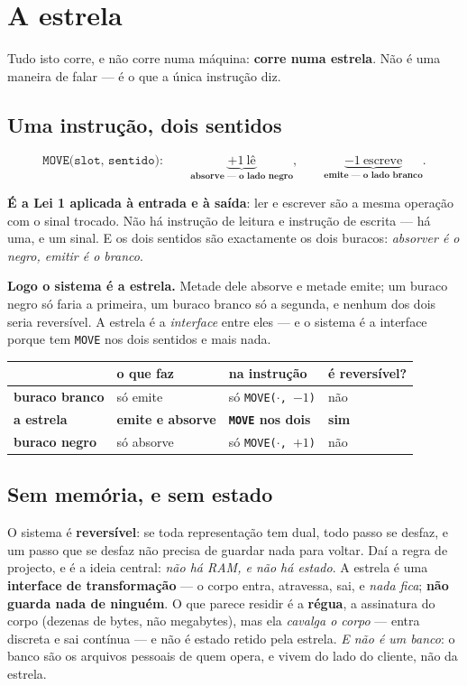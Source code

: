\documentclass[11pt,a4paper]{article}
\newcommand{\code}[1]{\texttt{\small #1}}
\begin{document}
\section{A estrela}\label{sec:estrela}

Tudo isto corre, e não corre numa máquina: \textbf{corre numa estrela}. Não é uma maneira de falar
--- é o que a única instrução diz.

\subsection*{Uma instrução, dois sentidos}

\[
  \texttt{MOVE(slot, sentido)} : \qquad
  \underbrace{+1 \ \text{lê}}_{\textbf{absorve --- o lado negro}}, \qquad
  \underbrace{-1 \ \text{escreve}}_{\textbf{emite --- o lado branco}} .
\]

\noindent \textbf{É a Lei 1 aplicada à entrada e à saída}: ler e escrever são a mesma operação com o
sinal trocado. Não há instrução de leitura e instrução de escrita --- há uma, e um sinal. E os dois
sentidos são exactamente os dois buracos: \emph{absorver é o negro, emitir é o branco}.

\smallskip
\noindent \textbf{Logo o sistema é a estrela.} Metade dele absorve e metade emite; um buraco negro
só faria a primeira, um buraco branco só a segunda, e nenhum dos dois seria reversível. A estrela é
a \emph{interface} entre eles --- e o sistema é a interface porque tem \code{MOVE} nos dois sentidos
e mais nada.

\begin{center}\small
\begin{tabular}{@{}llll@{}}
\toprule
 & o que faz & na instrução & é reversível? \\
\midrule
\textbf{buraco branco} & só emite & só \code{MOVE($\cdot$,\,$-1$)} & não \\
\textbf{a estrela} & \textbf{emite e absorve} & \textbf{\code{MOVE} nos dois} & \textbf{sim} \\
\textbf{buraco negro} & só absorve & só \code{MOVE($\cdot$,\,$+1$)} & não \\
\bottomrule
\end{tabular}
\end{center}

\subsection*{Sem memória, e sem estado}

O sistema é \textbf{reversível}: se toda representação tem dual, todo passo se desfaz, e um passo
que se desfaz não precisa de guardar nada para voltar. Daí a regra de projecto, e é a ideia central:
\emph{não há RAM, e não há estado}. A estrela é uma \textbf{interface de transformação} --- o corpo
entra, atravessa, sai, e \emph{nada fica}; \textbf{não guarda nada de ninguém}. O que parece residir
é a \textbf{régua}, a assinatura do corpo (dezenas de bytes, não megabytes), mas ela \emph{cavalga o
corpo} --- entra discreta e sai contínua --- e não é estado retido pela estrela. \emph{E não é um
banco}: o banco são os arquivos pessoais de quem opera, e vivem do lado do cliente, não da estrela.
\end{document}
